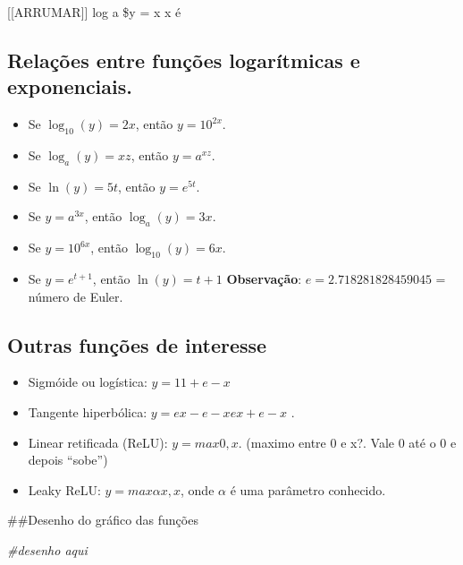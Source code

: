\documentclass[
]{article}
\newenvironment{Shaded}{\begin{snugshade}}{\end{snugshade}}
\newcommand{\CommentTok}[1]{\textcolor[rgb]{0.56,0.35,0.01}{\textit{#1}}}
\providecommand{\tightlist}{%
  \setlength{\itemsep}{0pt}\setlength{\parskip}{0pt}}
\begin{document}
{[}{[}ARRUMAR{]}{]} log a \$y = x x é

\hypertarget{relauxe7uxf5es-entre-funuxe7uxf5es-logaruxedtmicas-e-exponenciais.}{%
\subsection{Relações entre funções logarítmicas e
exponenciais.}\label{relauxe7uxf5es-entre-funuxe7uxf5es-logaruxedtmicas-e-exponenciais.}}

\begin{itemize}
\tightlist
\item
  Se \(\log_{10}(y) = 2x\), então \(y = 10^{2x}\).
\item
  Se \(\log_{a}(y) = xz\), então \(y = a^{xz}\).
\item
  Se \(\ln(y) = 5t\), então \(y = e^{5t}\).
\item
  Se \(y = a^{3x}\), então \(\log_a(y) = 3x\).
\item
  Se \(y = 10^{6x}\), então \(\log_{10}(y) = 6x\).
\item
  Se \(y = e^{t+1}\), então \(\ln(y) = t+1\) \textbf{Observação}:
  \(e = 2.718281828459045\) = número de Euler.
\end{itemize}

\hypertarget{outras-funuxe7uxf5es-de-interesse}{%
\subsection{Outras funções de
interesse}\label{outras-funuxe7uxf5es-de-interesse}}

\begin{itemize}
\tightlist
\item
  Sigmóide ou logística: \(y = 1 1+𝑒-x\)
\item
  Tangente hiperbólica: \(y = 𝑒x-𝑒-x 𝑒x+𝑒-x\) .
\item
  Linear retificada (ReLU): \(y = max{0,x}\). (maximo entre 0 e x?. Vale
  0 até o 0 e depois ``sobe'')
\item
  Leaky ReLU: \(y = max{𝛼x, x}\), onde \(\alpha\) é uma parâmetro
  conhecido.
\end{itemize}

\#\#Desenho do gráfico das funções

\begin{Shaded}
\begin{Highlighting}[]
\CommentTok{\#desenho aqui}
\end{Highlighting}
\end{Shaded}
\end{document}
